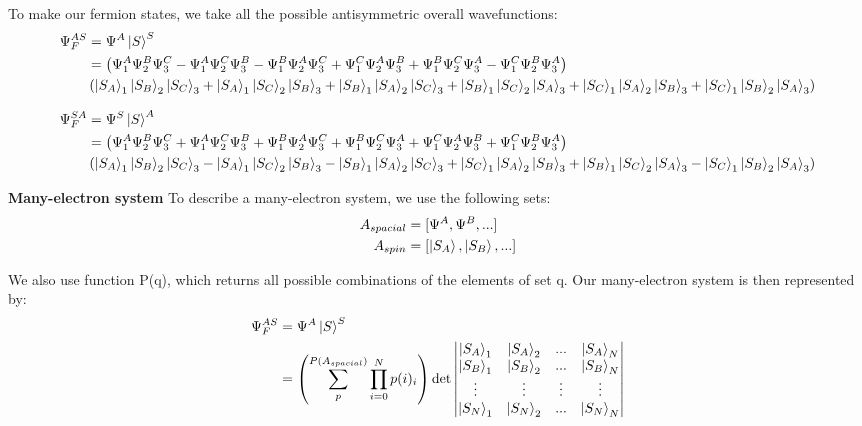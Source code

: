 \documentclass[10pt]{article} %
\begin{document}
To make our fermion states, we take all the possible antisymmetric overall wavefunctions:\\

\begin{align*}
  \Psi_F^{AS} &= \Psi^A\ket{S}^S\\
  &= \left(\Psi_1^A\Psi_2^B\Psi_3^C - \Psi_1^A\Psi_2^C\Psi_3^B
  - \Psi_1^B\Psi_2^A\Psi_3^C + \Psi_1^C\Psi_2^A\Psi_3^B
  + \Psi_1^B\Psi_2^C\Psi_3^A - \Psi_1^C\Psi_2^B\Psi_3^A\right)\\
  &\left(\ket{S_A}_1\ket{S_B}_2\ket{S_C}_3 + \ket{S_A}_1\ket{S_C}_2\ket{S_B}_3
  + \ket{S_B}_1\ket{S_A}_2\ket{S_C}_3 + \ket{S_B}_1\ket{S_C}_2\ket{S_A}_3
  + \ket{S_C}_1\ket{S_A}_2\ket{S_B}_3 + \ket{S_C}_1\ket{S_B}_2\ket{S_A}_3\right)\\
\end{align*}

\begin{align*}
  \Psi_F^{SA} &= \Psi^S\ket{S}^A\\
  &= \left(\Psi_1^A\Psi_2^B\Psi_3^C + \Psi_1^A\Psi_2^C\Psi_3^B
  + \Psi_1^B\Psi_2^A\Psi_3^C + \Psi_1^B\Psi_2^C\Psi_3^A
  + \Psi_1^C\Psi_2^A\Psi_3^B + \Psi_1^C\Psi_2^B\Psi_3^A\right)\\
  &\left(\ket{S_A}_1\ket{S_B}_2\ket{S_C}_3 - \ket{S_A}_1\ket{S_C}_2\ket{S_B}_3
  - \ket{S_B}_1\ket{S_A}_2\ket{S_C}_3 + \ket{S_C}_1\ket{S_A}_2\ket{S_B}_3
  + \ket{S_B}_1\ket{S_C}_2\ket{S_A}_3 - \ket{S_C}_1\ket{S_B}_2\ket{S_A}_3\right)\\
\end{align*}

\textbf{Many-electron system}
To describe a many-electron system, we use the following sets:\\

\begin{align*}
  A_{spacial} &= [\Psi^A, \Psi^B, ...]\\
  A_{spin} &= [\ket{S_A}, \ket{S_B}, ...]\\
\end{align*}

We also use function P(q), which returns all possible combinations of the elements of set q. Our
many-electron system is then represented by:\\

\begin{align*}
  \Psi_F^{AS} &= \Psi^A\ket{S}^S\\
  &= \left(\sum_p^{P(A_{spacial})}\prod_{i=0}^N p(i)_i\right)\det
  \begin{vmatrix}
    \ket{S_A}_1 & \ket{S_A}_2 & ... & \ket{S_A}_N\\
    \ket{S_B}_1 & \ket{S_B}_2 & ... & \ket{S_B}_N\\
    \vdots & \vdots & \vdots & \vdots\\
    \ket{S_N}_1 & \ket{S_N}_2 & ... & \ket{S_N}_N\\
  \end{vmatrix}
\end{align*}
\end{document}
